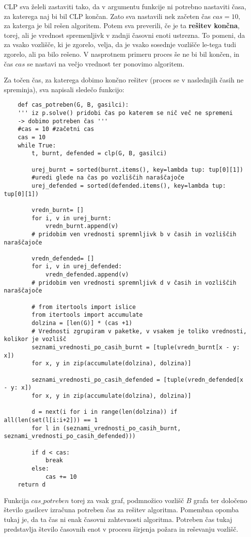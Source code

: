 \documentclass[a4paper, 12pt]{article}
\begin{document}
CLP sva želeli zastaviti tako, da v argumentu funkcije ni potrebno nastaviti časa,
za katerega naj bi bil CLP končan. Zato sva nastavili nek začeten čas $cas = 10,$ za katerga 
je bil rešen algoritem. Potem sva preverili, če je ta \textbf{rešitev končna}, 
torej, ali je vrednost spremenljivk v zadnji časovni enoti ustrezna.
To pomeni, da za vsako vozlišče, ki je zgorelo, velja, da je vsako sosednje
vozlišče le-tega tudi zgorelo, ali pa bilo rešeno. V nasprotnem primeru 
proces še ne bi bil končen, in čas $cas$ se nastavi na večjo vrednost ter
ponovimo algoritem. \pagebreak

Za točen čas, za katerega dobimo končno rešitev (proces se v naslednjih časih ne spreminja),
sva napisali sledečo funkcijo:
\begin{verbatim}
    def cas_potreben(G, B, gasilci):
    ''' iz p.solve() pridobi čas po katerem se nič več ne spremeni 
    -> dobimo potreben čas '''
    #cas = 10 #začetni cas
    cas = 10
    while True:
        t, burnt, defended = clp(G, B, gasilci)

        urej_burnt = sorted(burnt.items(), key=lambda tup: tup[0][1])
        #uredi glede na čas po vozliščih naraščajoče
        urej_defended = sorted(defended.items(), key=lambda tup: tup[0][1]) 

        vredn_burnt= []
        for i, v in urej_burnt:
            vredn_burnt.append(v)
        # pridobim ven vrednosti spremnljivk b v časih in vozliščih naraščajoče

        vredn_defended= []
        for i, v in urej_defended:
            vredn_defended.append(v)
        # pridobim ven vrednosti spremnljivk d v časih in vozliščih naraščajoče

        # from itertools import islice
        from itertools import accumulate
        dolzina = [len(G)] * (cas +1) 
        # Vrednosti zgrupiram v paketke, v vsakem je toliko vrednosti, kolikor je vozlišč
        seznami_vrednosti_po_casih_burnt = [tuple(vredn_burnt[x - y: x]) 
        for x, y in zip(accumulate(dolzina), dolzina)]

        seznami_vrednosti_po_casih_defended = [tuple(vredn_defended[x - y: x]) 
        for x, y in zip(accumulate(dolzina), dolzina)]

        d = next(i for i in range(len(dolzina)) if all(len(set(l[i:i+2])) == 1 
        for l in (seznami_vrednosti_po_casih_burnt, seznami_vrednosti_po_casih_defended)))
        
        if d < cas:
            break
        else:
            cas += 10
    return d
\end{verbatim}
Funkcija $cas\_potreben$ torej za vsak graf, podmnožico vozlišč $B$ grafa ter določeno število gasilcev
izračuna potreben čas za rešitev algoritma. Pomembna opomba tukaj je, da ta čas ni enak časovni zahtevnosti
algoritma. Potreben čas tukaj predstavlja število časovnih enot v procesu širjenja požara in reševanju vozlišč.



% 
% 

\end{document}
